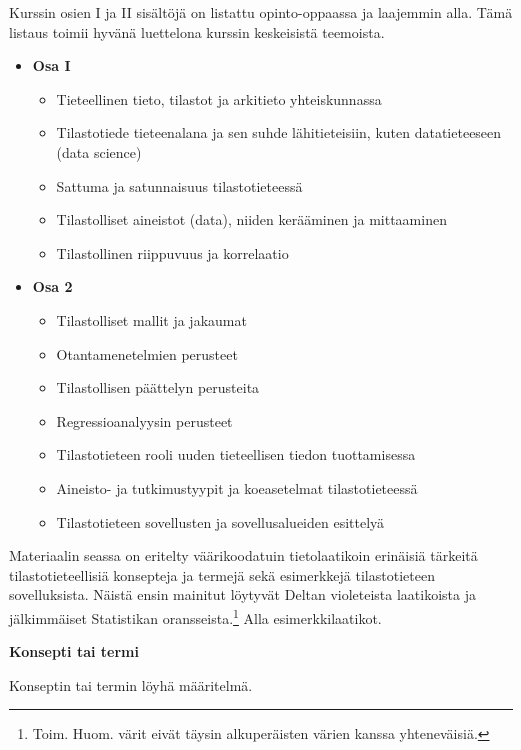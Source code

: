 \documentclass[
]{book}
\providecommand{\tightlist}{%
  \setlength{\itemsep}{0pt}\setlength{\parskip}{0pt}}
\begin{document}
Kurssin osien I ja II sisältöjä on listattu opinto-oppaassa ja laajemmin alla. Tämä listaus toimii hyvänä luettelona kurssin keskeisistä teemoista.

\begin{itemize}
\tightlist
\item
  \textbf{Osa I}

  \begin{itemize}
  \tightlist
  \item
    Tieteellinen tieto, tilastot ja arkitieto yhteiskunnassa
  \item
    Tilastotiede tieteenalana ja sen suhde lähitieteisiin, kuten datatieteeseen (data science)
  \item
    Sattuma ja satunnaisuus tilastotieteessä
  \item
    Tilastolliset aineistot (data), niiden kerääminen ja mittaaminen
  \item
    Tilastollinen riippuvuus ja korrelaatio
  \end{itemize}
\item
  \textbf{Osa 2}

  \begin{itemize}
  \tightlist
  \item
    Tilastolliset mallit ja jakaumat
  \item
    Otantamenetelmien perusteet
  \item
    Tilastollisen päättelyn perusteita
  \item
    Regressioanalyysin perusteet
  \item
    Tilastotieteen rooli uuden tieteellisen tiedon tuottamisessa
  \item
    Aineisto- ja tutkimustyypit ja koeasetelmat tilastotieteessä
  \item
    Tilastotieteen sovellusten ja sovellusalueiden esittelyä
  \end{itemize}
\end{itemize}

Materiaalin seassa on eritelty väärikoodatuin tietolaatikoin erinäisiä tärkeitä tilastotieteellisiä konsepteja ja termejä sekä esimerkkejä tilastotieteen sovelluksista. Näistä ensin mainitut löytyvät Deltan violeteista laatikoista ja jälkimmäiset Statistikan oransseista.\footnote{Toim. Huom. värit eivät täysin alkuperäisten värien kanssa yhteneväisiä.} Alla esimerkkilaatikot.

\begin{defblock}{}
\textbf{Konsepti tai termi}

Konseptin tai termin löyhä määritelmä.

\end{defblock}
\end{document}
